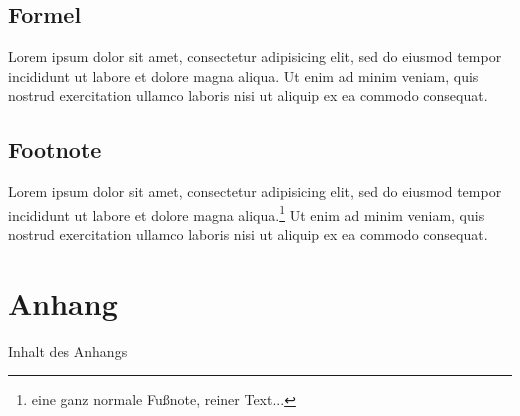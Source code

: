 \section{Formel}
Lorem ipsum dolor sit amet, consectetur adipisicing elit, sed do eiusmod tempor incididunt ut labore et dolore magna aliqua. Ut enim ad minim veniam, quis nostrud exercitation ullamco laboris nisi ut aliquip ex ea commodo consequat.

\section{Footnote}
Lorem ipsum dolor sit amet, consectetur adipisicing elit, sed do eiusmod tempor incididunt ut labore et dolore magna aliqua.\footnote{eine ganz normale Fußnote, reiner Text...} Ut enim ad minim veniam, quis nostrud exercitation ullamco laboris nisi ut aliquip ex ea commodo consequat.

\seAppendix{}

\setcounter{page}{7}

\chapter{Anhang}

Inhalt des Anhangs

\newpage
\sePrintGlossary{}


\sePrintBibliography{}




\seEhrenwoertlicheErklaerung{}


